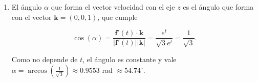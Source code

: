\documentclass[
  spanish,
  a4paper,
]{scrreport}
\theoremstyle{definition}
\theoremstyle{remark}
\begin{document}
\begin{tcolorbox}
\begin{enumerate}
  \[
  a_T(t) = |\mathbf{v}(t)|' = \left(\sqrt{3}e^t\right)' = \sqrt{3}e^t,
  \]

  y la componente normal es

  \[
  a_N(t) = \kappa(t)|\mathbf{v}(t)|^2 = \frac{\sqrt{2}}{3e^t}\cdot 3e^{2t} = \sqrt{2}e^t.
  \]

  Así pues, en el instante \(t=0\) se tiene \(a_T(0) = \sqrt{3}\)
  m/s\(^2\) y \(a_N(0) = \sqrt{2}\) m/s\(^2\).

  Podemos comprobar el resultado observando que
  \(\mathbf{f}'(0) = (1,1,1)\) y \(\mathbf{f}''(0) = (0,2,1)\), de
  manera que

  \begin{align*}
  a_T(0) &= \frac{\mathbf{f}'(0)\cdot \mathbf{f}''(0)}{|\mathbf{f}'(0)|} = \frac{(1,1,1)\cdot(0,2,1)}{\sqrt{3}} = \frac{3}{\sqrt{3}} = \sqrt{3},\\
  a_N(0) &= \frac{|\mathbf{f}'(0)\times \mathbf{f}''(0)|}{|\mathbf{f}'(0)|} = \frac{|(-1,-1,2)|}{\sqrt{3}} = \frac{\sqrt{6}}{\sqrt{3}} = \sqrt{2},
  \end{align*}

  y que \(a_T(0)^2 + a_N(0)^2 = 3 + 2 = 5 = |\mathbf{f}''(0)|^2\).
\item
  El ángulo \(\alpha\) que forma el vector velocidad con el eje \(z\) es
  el ángulo que forma con el vector \(\mathbf{k}=(0,0,1)\), que cumple

  \[
  \cos(\alpha) = \frac{\mathbf{f}'(t)\cdot \mathbf{k}}{|\mathbf{f}'(t)||\mathbf{k}|} = \frac{e^t}{\sqrt{3}e^t} = \frac{1}{\sqrt{3}}.
  \]

  Como no depende de \(t\), el ángulo es constante y vale
  \(\alpha = \arccos\left(\frac{1}{\sqrt{3}}\right) \approx 0.9553\) rad
  \(\approx 54.74^\circ\).
\end{enumerate}

\end{tcolorbox}
\end{document}
